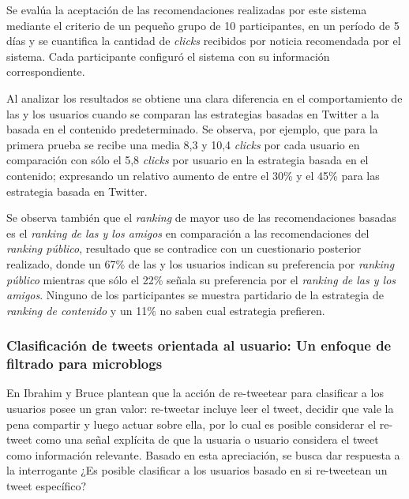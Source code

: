    Se evalúa la aceptación de las recomendaciones realizadas por este sistema mediante el criterio de un pequeño grupo de 10 participantes, en un período de 5 días y se cuantifica la cantidad de \emph{clicks} recibidos por noticia recomendada por el sistema. Cada participante configuró el sistema con su información correspondiente.

	Al analizar los resultados se obtiene una clara diferencia en el comportamiento de las y los usuarios cuando se comparan las estrategias basadas en Twitter a la basada en el contenido predeterminado. Se observa, por ejemplo, que para la primera prueba se recibe una media 8,3 y 10,4 \emph{clicks} por cada usuario en comparación con sólo el 5,8 \emph{clicks} por usuario en la estrategia basada en el contenido; expresando un relativo aumento de entre el 30\% y el 45\% para las estrategia basada en Twitter.

	Se observa también que el \emph{ranking} de mayor uso de las recomendaciones basadas es el \emph{ranking de las y los amigos} en comparación a las recomendaciones del \emph{ranking público}, resultado que se contradice con un cuestionario posterior realizado, donde un 67\% de las y los usuarios indican su preferencia por \emph{ranking público} mientras que sólo el 22\% señala su preferencia por el \emph{ranking de las y los amigos}. Ninguno de los participantes se muestra partidario de la estrategia de \emph{ranking de contenido} y un 11\% no saben cual estrategia prefieren.

\subsubsection{Clasificación de tweets orientada al usuario: Un enfoque de filtrado para microblogs}


En \cite{conf/cikm/UysalC11} Ibrahim y Bruce plantean que la acción de re-tweetear para clasificar a los usuarios posee un gran valor: re-tweetar incluye leer el tweet, decidir que vale la pena compartir y luego actuar sobre ella, por lo cual es posible considerar el re-tweet como una señal explícita de que la usuaria o usuario considera el tweet como información relevante. Basado en esta apreciación, se busca dar respuesta a la interrogante  ¿Es posible clasificar a los usuarios basado en si re-tweetean un tweet específico?

